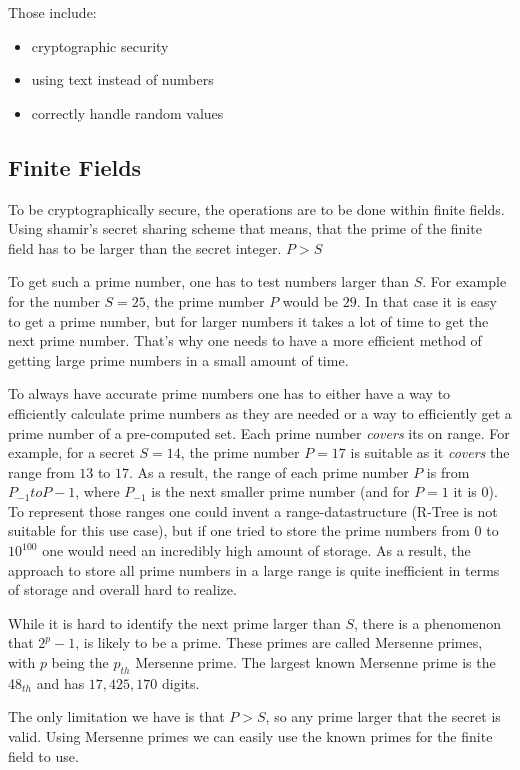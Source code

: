 Those include:

\begin{itemize}
  \item cryptographic security
  \item using text instead of numbers
  \item correctly handle random values
\end{itemize}

\subsection{Finite Fields}

To be cryptographically secure, the operations are to be done within finite
fields. Using shamir's secret sharing scheme that means, that the prime of the
finite field has to be larger than the secret integer. $P > S$

To get such a prime number, one has to test numbers larger than $S$. For example
for the number $S = 25$, the prime number $P$ would be $29$. In that case it is
easy to get a prime number, but for larger numbers it takes a lot of time to get
the next prime number. That's why one needs to have a more efficient method of
getting large prime numbers in a small amount of time.

To always have accurate prime numbers one has to either have a way to efficiently
calculate prime numbers as they are needed or a way to efficiently get a prime
number of a pre-computed set. Each prime number \textit{covers} its on range. For
example, for a secret $S = 14$, the prime number $P = 17$ is suitable as it
\textit{covers} the range from $13$ to $17$. As a result, the range of each
prime number $P$ is from $P_{-1} to P-1$, where $P_{-1}$ is the next smaller
prime number (and for $P = 1$ it is $0$). To represent those ranges one could
invent a range-datastructure (R-Tree is not suitable for this use case), but
if one tried to store the prime numbers from $0$ to $10^{100}$ one would need
an incredibly high amount of storage. As a result, the approach to store all
prime numbers in a large range is quite inefficient in terms of storage and
overall hard to realize.

While it is hard to identify the next prime larger than $S$, there is
a phenomenon that $2^p-1$, is likely to be a prime. These primes are called
Mersenne primes, with $p$ being the $p_{th}$ Mersenne prime. The largest known
Mersenne prime is the 48$_{th}$ and has $17,425,170$ digits.

The only limitation we have is that $P > S$, so any prime larger that the
secret is valid. Using Mersenne primes we can easily use the known primes for
the finite field to use.

